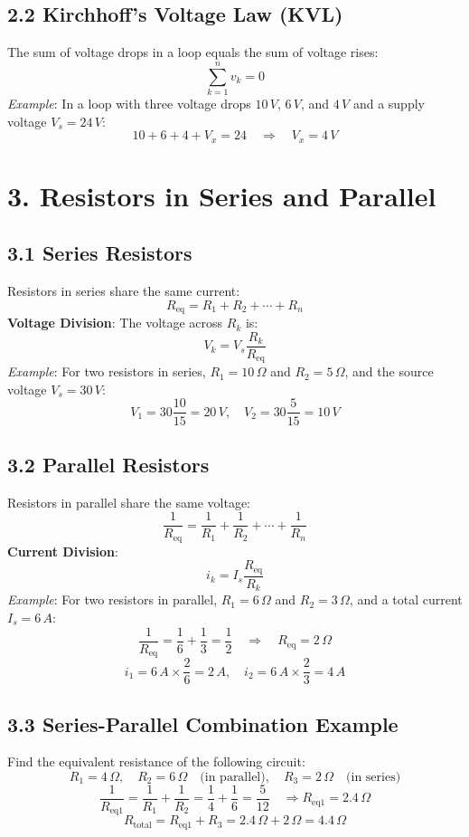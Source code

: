 \documentclass[10pt]{article}
\begin{document}
\begin{multicols}{2}
\subsection*{2.2 Kirchhoff's Voltage Law (KVL)}
The sum of voltage drops in a loop equals the sum of voltage rises:
\[
\sum_{k=1}^{n} v_k = 0
\]
\textit{Example}: In a loop with three voltage drops \(10\,V\), \(6\,V\), and \(4\,V\) and a supply voltage \(V_s = 24\,V\):
\[
10 + 6 + 4 + V_x = 24 \quad \Rightarrow \quad V_x = 4\,V
\]

\section*{3. Resistors in Series and Parallel}

\subsection*{3.1 Series Resistors}
Resistors in series share the same current:
\[
R_{\text{eq}} = R_1 + R_2 + \cdots + R_n
\]
\textbf{Voltage Division}: The voltage across \(R_k\) is:
\[
V_k = V_s \frac{R_k}{R_{\text{eq}}}
\]
\textit{Example}: For two resistors in series, \(R_1 = 10\,\Omega\) and \(R_2 = 5\,\Omega\), and the source voltage \(V_s = 30\,V\):
\[
V_1 = 30 \frac{10}{15} = 20\,V, \quad V_2 = 30 \frac{5}{15} = 10\,V
\]

\subsection*{3.2 Parallel Resistors}
Resistors in parallel share the same voltage:
\[
\frac{1}{R_{\text{eq}}} = \frac{1}{R_1} + \frac{1}{R_2} + \cdots + \frac{1}{R_n}
\]
\textbf{Current Division}:
\[
i_k = I_s \frac{R_{\text{eq}}}{R_k}
\]
\textit{Example}: For two resistors in parallel, \(R_1 = 6\,\Omega\) and \(R_2 = 3\,\Omega\), and a total current \(I_s = 6\,A\):
\[
\frac{1}{R_{\text{eq}}} = \frac{1}{6} + \frac{1}{3} = \frac{1}{2} \quad \Rightarrow \quad R_{\text{eq}} = 2\,\Omega
\]
\[
i_1 = 6\,A \times \frac{2}{6} = 2\,A, \quad i_2 = 6\,A \times \frac{2}{3} = 4\,A
\]

\subsection*{3.3 Series-Parallel Combination Example}
Find the equivalent resistance of the following circuit:
\[
R_1 = 4\,\Omega, \quad R_2 = 6\,\Omega \quad \text{(in parallel)}, \quad R_3 = 2\,\Omega \quad \text{(in series)}
\]
\[
\frac{1}{R_{\text{eq1}}} = \frac{1}{R_1} + \frac{1}{R_2} = \frac{1}{4} + \frac{1}{6} = \frac{5}{12} \quad \Rightarrow R_{\text{eq1}} = 2.4\,\Omega
\]
\[
R_{\text{total}} = R_{\text{eq1}} + R_3 = 2.4\,\Omega + 2\,\Omega = 4.4\,\Omega
\]


\end{multicols}
\end{document}
